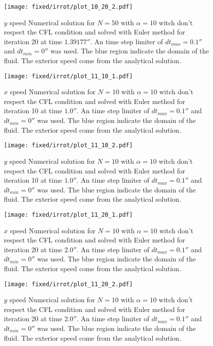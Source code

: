 \begin{figure}
\texttt{[image: fixed/irrot/plot\_10\_20\_2.pdf]}
\caption{$y$ speed Numerical solution for $N=50$ with $\alpha=10$ witch don't respect the CFL condition and solved with Euler method
for iteration 20 at time $\unit{1.39177}{\second}$.
An time step limiter of $dt_{max}=\unit{0.1}{\second}$ and $dt_{min}=\unit{0}{\second}$ was used.
The blue region indicate the domain of the fluid. The exterior speed come from the analytical solution.
}
\end{figure}

\begin{figure}
\texttt{[image: fixed/irrot/plot\_11\_10\_1.pdf]}
\caption{$x$ speed Numerical solution for $N=10$ with $\alpha=10$ witch don't respect the CFL condition and solved with Euler method
for iteration 10 at time $\unit{1.0}{\second}$.
An time step limiter of $dt_{max}=\unit{0.1}{\second}$ and $dt_{min}=\unit{0}{\second}$ was used.
The blue region indicate the domain of the fluid. The exterior speed come from the analytical solution.
}
\end{figure}

\begin{figure}
\texttt{[image: fixed/irrot/plot\_11\_10\_2.pdf]}
\caption{$y$ speed Numerical solution for $N=10$ with $\alpha=10$ witch don't respect the CFL condition and solved with Euler method
for iteration 10 at time $\unit{1.0}{\second}$.
An time step limiter of $dt_{max}=\unit{0.1}{\second}$ and $dt_{min}=\unit{0}{\second}$ was used.
The blue region indicate the domain of the fluid. The exterior speed come from the analytical solution.
}
\end{figure}

\begin{figure}
\texttt{[image: fixed/irrot/plot\_11\_20\_1.pdf]}
\caption{$x$ speed Numerical solution for $N=10$ with $\alpha=10$ witch don't respect the CFL condition and solved with Euler method
for iteration 20 at time $\unit{2.0}{\second}$.
An time step limiter of $dt_{max}=\unit{0.1}{\second}$ and $dt_{min}=\unit{0}{\second}$ was used.
The blue region indicate the domain of the fluid. The exterior speed come from the analytical solution.
}
\end{figure}

\begin{figure}
\texttt{[image: fixed/irrot/plot\_11\_20\_2.pdf]}
\caption{$y$ speed Numerical solution for $N=10$ with $\alpha=10$ witch don't respect the CFL condition and solved with Euler method
for iteration 20 at time $\unit{2.0}{\second}$.
An time step limiter of $dt_{max}=\unit{0.1}{\second}$ and $dt_{min}=\unit{0}{\second}$ was used.
The blue region indicate the domain of the fluid. The exterior speed come from the analytical solution.
}
\end{figure}

